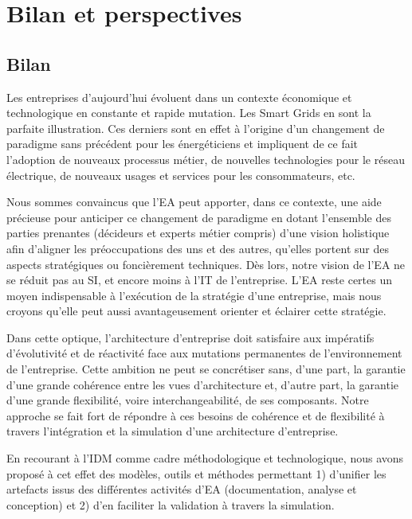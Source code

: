 \chapter{Bilan et perspectives}
\label{ch:bilan}

\section{Bilan}

Les entreprises d'aujourd'hui évoluent dans un contexte économique
et technologique en constante et rapide mutation. Les Smart Grids
en sont la parfaite illustration. Ces derniers sont en effet à l'origine d'un changement
de paradigme sans précédent pour les énergéticiens et impliquent de ce fait
l'adoption de nouveaux processus métier, de nouvelles technologies pour le réseau
électrique, de nouveaux usages et services pour les consommateurs, etc. 

Nous sommes convaincus que l'EA peut apporter, dans ce contexte,
une aide précieuse pour anticiper ce changement de paradigme en dotant l'ensemble
des parties prenantes (décideurs et experts métier compris) d'une
vision holistique afin d'aligner les préoccupations des uns et des autres, qu'elles portent sur
des aspects stratégiques ou foncièrement techniques. Dès lors, notre vision de l'EA ne se réduit
pas au SI, et encore moins à l'IT de l'entreprise. L'EA reste certes un moyen indispensable
à l’exécution de la stratégie d'une entreprise, mais nous croyons qu'elle peut aussi
avantageusement orienter et éclairer cette stratégie.

Dans cette optique, l'architecture d'entreprise doit satisfaire aux impératifs d'évolutivité et
de réactivité face aux mutations permanentes de l'environnement de l'entreprise. Cette ambition
ne peut se concrétiser sans, d'une part, la garantie d'une grande cohérence  entre les vues d'architecture
et, d'autre part, la garantie d'une grande flexibilité, voire interchangeabilité, de ses composants. Notre approche
se fait fort de répondre à ces besoins de cohérence et de flexibilité à travers l'intégration et
la simulation d'une architecture d'entreprise. 

En recourant à l'IDM comme cadre méthodologique et technologique,
nous avons proposé à cet effet des modèles, outils et méthodes permettant 1) d'unifier les artefacts
issus des différentes activités d'EA (documentation, analyse et conception)
et 2) d'en faciliter la validation à travers la simulation.

